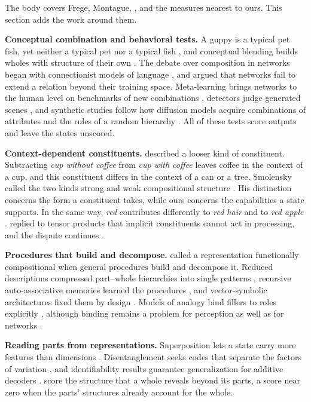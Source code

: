 The body covers Frege, Montague, \citet{fodor1988}, \citet{smolensky1990} and the measures nearest to ours. This section adds the work around them.

\textbf{Conceptual combination and behavioral tests.} A guppy is a typical pet fish, yet neither a typical pet nor a typical fish \citep{osherson1981}, and conceptual blending builds wholes with structure of their own \citep{fauconnier2002,janssen1997}. The debate over composition in networks began with connectionist models of language \citep{rumelhart1986,pinker1988,elman1990}, and \citet{marcus1998} argued that networks fail to extend a relation beyond their training space. Meta-learning brings networks to the human level on benchmarks of new combinations \citep{lake2023}, detectors judge generated scenes \citep{ramesh2021}, and synthetic studies follow how diffusion models acquire combinations of attributes \citep{okawa2023} and the rules of a random hierarchy \citep{favero2025diffusion}. All of these tests score outputs and leave the states unscored.

\textbf{Context-dependent constituents.} \citet{smolensky1988} described a looser kind of constituent. Subtracting \emph{cup without coffee} from \emph{cup with coffee} leaves coffee in the context of a cup, and this constituent differs in the context of a can or a tree. Smolensky called the two kinds strong and weak compositional structure \citep{smolensky1987}. His distinction concerns the form a constituent takes, while ours concerns the capabilities a state supports. In the same way, \emph{red} contributes differently to \emph{red hair} and to \emph{red apple} \citep{kamp1995}. \citet{fodor1990} replied to tensor products that implicit constituents cannot act in processing, and the dispute continues \citep{goodale2026}.

\textbf{Procedures that build and decompose.} \citet{vangelder1990} called a representation functionally compositional when general procedures build and decompose it. Reduced descriptions compressed part--whole hierarchies into single patterns \citep{hinton1990}, recursive auto-associative memories learned the procedures \citep{pollack1990}, and vector-symbolic architectures fixed them by design \citep{plate1995,gayler2006,kanerva2009}. Models of analogy bind fillers to roles explicitly \citep{hummel1997}, although binding remains a problem for perception as well as for networks \citep{treisman1980,greff2020}.

\textbf{Reading parts from representations.} Superposition lets a state carry more features than dimensions \citep{elhage2022}. Disentanglement seeks codes that separate the factors of variation \citep{bengio2013,locatello2019}, and identifiability results guarantee generalization for additive decoders \citep{lachapelle2023,wiedemer2024}. \citet{elmoznino2026} score the structure that a whole reveals beyond its parts, a score near zero when the parts' structures already account for the whole.

